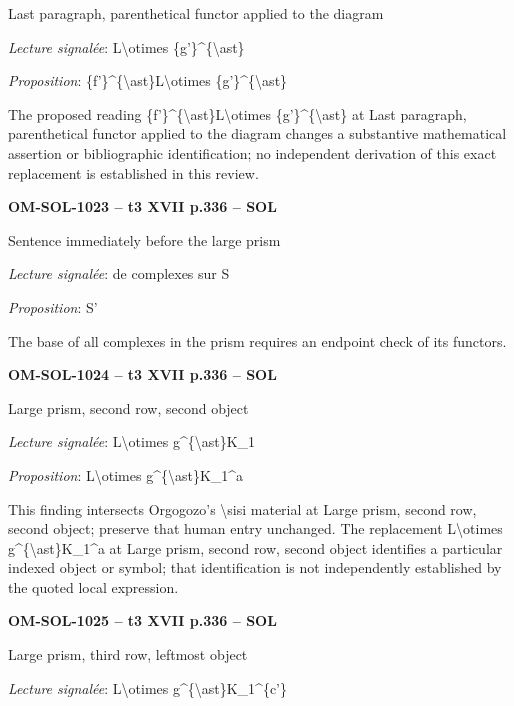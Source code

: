 Last paragraph, parenthetical functor applied to the diagram\par
\emph{Lecture signalée}: L\textbackslash{}otimes \{g'\}\textasciicircum{}\{\textbackslash{}ast\}\par
\emph{Proposition}: \{f'\}\textasciicircum{}\{\textbackslash{}ast\}L\textbackslash{}otimes \{g'\}\textasciicircum{}\{\textbackslash{}ast\}\par
The proposed reading \{f'\}\textasciicircum{}\{\textbackslash{}ast\}L\textbackslash{}otimes \{g'\}\textasciicircum{}\{\textbackslash{}ast\} at Last paragraph, parenthetical functor applied to the diagram changes a substantive mathematical assertion or bibliographic identification; no independent derivation of this exact replacement is established in this review.\par
\par\noindent\textbf{OM-SOL-1023 -- t3 XVII p.336 -- SOL}\par
Sentence immediately before the large prism\par
\emph{Lecture signalée}: de complexes sur S\par
\emph{Proposition}: S'\par
The base of all complexes in the prism requires an endpoint check of its functors.\par
\par\noindent\textbf{OM-SOL-1024 -- t3 XVII p.336 -- SOL}\par
Large prism, second row, second object\par
\emph{Lecture signalée}: L\textbackslash{}otimes g\textasciicircum{}\{\textbackslash{}ast\}K\_1\par
\emph{Proposition}: L\textbackslash{}otimes g\textasciicircum{}\{\textbackslash{}ast\}K\_1\textasciicircum{}a\par
This finding intersects Orgogozo's \textbackslash{}sisi material at Large prism, second row, second object; preserve that human entry unchanged. The replacement L\textbackslash{}otimes g\textasciicircum{}\{\textbackslash{}ast\}K\_1\textasciicircum{}a at Large prism, second row, second object identifies a particular indexed object or symbol; that identification is not independently established by the quoted local expression.\par
\par\noindent\textbf{OM-SOL-1025 -- t3 XVII p.336 -- SOL}\par
Large prism, third row, leftmost object\par
\emph{Lecture signalée}: L\textbackslash{}otimes g\textasciicircum{}\{\textbackslash{}ast\}K\_1\textasciicircum{}\{c'\}\par
